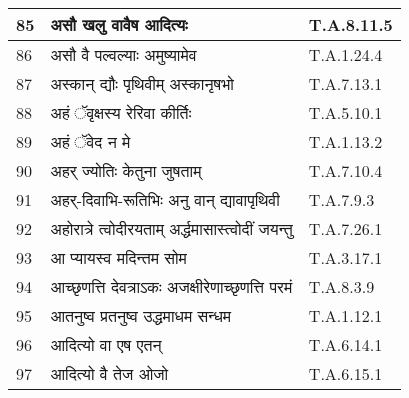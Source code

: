 \documentclass[17pt]{extarticle}
\begin{document}
\begin{longtable}{||p{0.4in}||p{4.9in}||p{0.9in}||}
    \hline
        
    85 & असौ खलु वावैष आदित्यः & T.A.8.11.5       \\
    
    \hline
        
    86 & असौ वै पल्वल्याः अमुष्यामेव & T.A.1.24.4       \\
    
    \hline
        
    87 & अस्कान् द्यौः पृथिवीम् अस्कानृषभो & T.A.7.13.1       \\
    
    \hline
        
    88 & अहं ॅवृक्षस्य रेरिवा कीर्तिः & T.A.5.10.1       \\
    
    \hline
        
    89 & अहं ॅवेद न मे & T.A.1.13.2       \\
    
    \hline
        
    90 & अहर् ज्योतिः केतुना जुषताम् & T.A.7.10.4       \\
    
    \hline
        
    91 & अहर्{-}दिवाभि{-}रूतिभिः अनु वान् द्यावापृथिवी & T.A.7.9.3       \\
    
    \hline
        
    92 & अहोरात्रे त्वोदीरयताम् अर्द्धमासास्त्वोदीं जयन्तु & T.A.7.26.1       \\
    
    \hline
        
    93 & आ प्यायस्व मदिन्तम सोम & T.A.3.17.1       \\
    
    \hline
        
    94 & आच्छृणत्ति देवत्राऽकः अजक्षीरेणाच्छृणत्ति परमं & T.A.8.3.9       \\
    
    \hline
        
    95 & आतनुष्व प्रतनुष्व उद्धमाधम सन्धम & T.A.1.12.1       \\
    
    \hline
        
    96 & आदित्यो वा एष एतन् & T.A.6.14.1       \\
    
    \hline
        
    97 & आदित्यो वै तेज ओजो & T.A.6.15.1       \\
    

\end{longtable}
\end{document}
